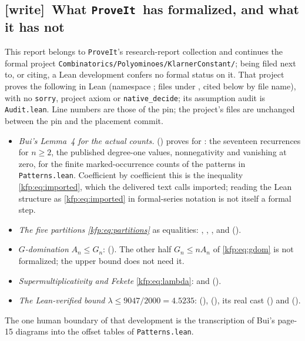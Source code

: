 \documentclass[11pt,a4paper]{article}
\theoremstyle{definition}
\theoremstyle{remark}
\newcommand{\repo}{\texttt{ProveIt}}
\newcommand{\wtag}{\textsf{\small[write]}}
\begin{document}
\subsection{\wtag\ What \repo\ has formalized, and what it has not}
\label{kfp:sec:formal-status}
This report belongs to \repo's research-report collection and continues the
formal project \texttt{Combinatorics/Polyominoes/KlarnerConstant/}; being
filed next to, or citing, a Lean development confers no formal status on it.
That project proves the following in Lean (namespace
; files under
, cited
below by file name), with no \texttt{sorry}, project axiom or
\texttt{native\_decide}; its assumption audit is \texttt{Audit.lean}. Line
numbers are those of the pin; the project's files are unchanged between the
pin and the placement commit.
\begin{itemize}
\item \emph{Bui's Lemma~4 for the actual counts.}
  ()
 proves  for
 : the
 seventeen recurrences for $n\geq2$, the published degree-one values,
 nonnegativity and vanishing at zero, for the finite marked-occurrence counts
 of the patterns in \texttt{Patterns.lean}. Coefficient by coefficient this is
 the inequality \eqref{kfp:eq:imported}, which the delivered text calls
 imported; reading the Lean structure as \eqref{kfp:eq:imported} in
 formal-series notation is not itself a formal step.
\item \emph{The five partitions \eqref{kfp:eq:partitions}} as equalities:
 , ,
 , 
 and 
 ().
\item \emph{$G$-domination} $A_n\leq G_n$:
 (). The other half $G_n\leq nA_n$ of
 \eqref{kfp:eq:gdom} is not formalized; the upper bound does not need it.
\item \emph{Supermultiplicativity and Fekete} \eqref{kfp:eq:lambda}:
  and
 ().
\item \emph{The Lean-verified bound $\lambda\leq9047/2000=4.5235$}:
  (),
  (),
 its real cast () and
  ().
\end{itemize}
The one human boundary of that development is the transcription of Bui's
page-15 diagrams into the offset tables of \texttt{Patterns.lean}.
\end{document}
